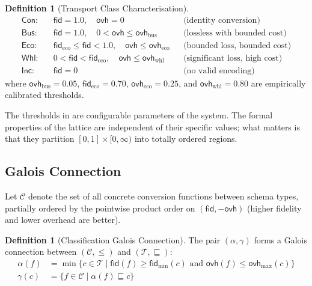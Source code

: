 \documentclass[11pt,a4paper]{article}
\theoremstyle{definition}
\newtheorem{definition}[theorem]{Definition}
\theoremstyle{remark}
\newcommand{\TC}{\mathcal{T}}                    %
\newcommand{\conc}{\textsf{Con}}                 %
\newcommand{\busi}{\textsf{Bus}}                 %
\newcommand{\econ}{\textsf{Eco}}                 %
\newcommand{\wheel}{\textsf{Whl}}               %
\newcommand{\incompat}{\textsf{Inc}}             %
\newcommand{\fid}{\mathsf{fid}}                  %
\newcommand{\ovh}{\mathsf{ovh}}                  %
\begin{document}
\begin{definition}[Transport Class Characterisation]\label{def:tc-chars}
\begin{align*}
  \conc:  &\quad \fid = 1.0, \quad \ovh = 0
    && \text{(identity conversion)} \\
  \busi:  &\quad \fid = 1.0, \quad 0 < \ovh \leq \ovh_{\text{bus}}
    && \text{(lossless with bounded cost)} \\
  \econ:  &\quad \fid_{\text{eco}} \leq \fid < 1.0, \quad
    \ovh \leq \ovh_{\text{eco}}
    && \text{(bounded loss, bounded cost)} \\
  \wheel: &\quad 0 < \fid < \fid_{\text{eco}}, \quad
    \ovh \leq \ovh_{\text{whl}}
    && \text{(significant loss, high cost)} \\
  \incompat: &\quad \fid = 0
    && \text{(no valid encoding)}
\end{align*}
where $\ovh_{\text{bus}} = 0.05$, $\fid_{\text{eco}} = 0.70$,
$\ovh_{\text{eco}} = 0.25$, and $\ovh_{\text{whl}} = 0.80$ are
empirically calibrated thresholds.
\end{definition}

The thresholds in  are configurable parameters of
the system. The formal properties of the lattice are independent of
their specific values; what matters is that they partition $[0,1]
\times [0, \infty)$ into totally ordered regions.

\subsection{Galois Connection}\label{sec:galois}

Let $\mathcal{C}$ denote the set of all concrete conversion functions
between schema types, partially ordered by the pointwise product order
on $(\fid, -\ovh)$ (higher fidelity and lower overhead are better).

\begin{definition}[Classification Galois Connection]
The pair $(\alpha, \gamma)$ forms a Galois connection between
$(\mathcal{C}, \leq)$ and $(\TC, \sqsubseteq)$:
\begin{align}
  \alpha(f) &= \min\{c \in \TC \mid \fid(f) \geq \fid_{\min}(c)
    \text{ and } \ovh(f) \leq \ovh_{\max}(c)\} \label{eq:alpha} \\
  \gamma(c) &= \{f \in \mathcal{C} \mid \alpha(f) \sqsubseteq c\}
    \label{eq:gamma}
\end{align}
\end{definition}
\end{document}
